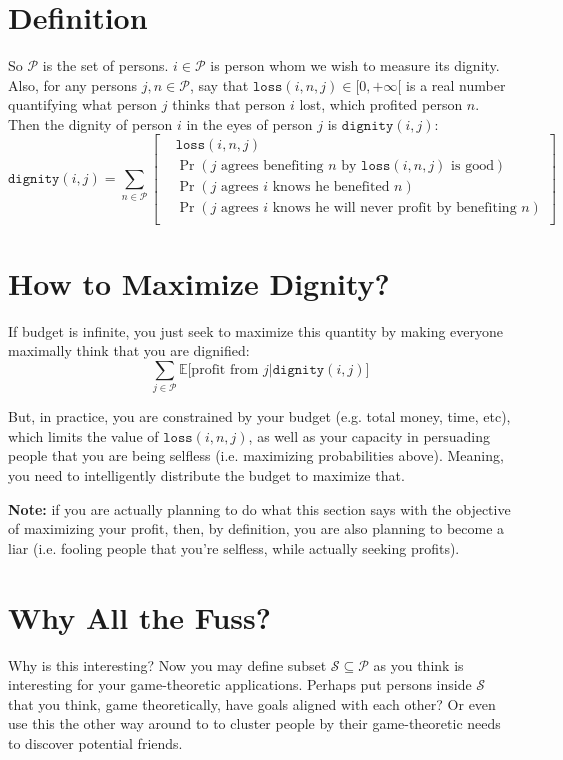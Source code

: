 \documentclass{report}
\begin{document}
\section{Definition}
So $\mathcal{P}$ is the set of persons. $i \in \mathcal{P}$ is person whom we
wish to measure its dignity.  Also, for any persons $j,n \in \mathcal{P}$, say
that $\texttt{loss}(i,n,j) \in [0, +\infty[$ is a real number quantifying what
person $j$ thinks that person $i$ lost, which profited person $n$. Then the
dignity of person $i$ in the eyes of person $j$ is $\texttt{dignity}(i,j)$:
\[
\texttt{dignity}(i,j) = 
\sum_{n \in \mathcal{P}}
\left[
\begin{split}
&\texttt{loss}(i,n,j)\\
&\Pr(\text{$j$ agrees benefiting $n$ by $\texttt{loss}(i,n,j)$ is good})\\
&\Pr(\text{$j$ agrees $i$ knows he benefited $n$})\\
&\Pr(\text{$j$ agrees $i$ knows he will never profit by benefiting $n$})\\
\end{split}
\right]
\]

\section{How to Maximize Dignity?}
If budget is infinite, you just seek to maximize this quantity by making
everyone maximally think that you are dignified:
\[
\sum_{j \in \mathcal{P}}
\mathbb{E}\big[
    \text{profit from $j$} 
    \big|
    \texttt{dignity}(i,j)
\big]
\]

But, in practice, you are constrained by your budget (e.g. total money,
time, etc), which limits the value of $\texttt{loss}(i,n,j)$, as well as your
capacity in persuading people that you are being selfless (i.e. maximizing
probabilities above). Meaning, you need to intelligently distribute the budget
to maximize that. 

\textbf{Note:} if you are actually planning to do what this section says with
the objective of maximizing your profit, then, by definition, you are also
planning to become a liar (i.e. fooling people that you're selfless, while
actually seeking profits).

\section{Why All the Fuss?}
Why is this interesting? Now you may define subset $\mathcal{S} \subseteq
\mathcal{P}$ as you think
is interesting for your game-theoretic applications. Perhaps put persons inside
$\mathcal{S}$ that you think, game theoretically, have goals aligned with each
other? Or even use this the other way around to to cluster people by their
game-theoretic needs to discover potential friends.
\end{document}
